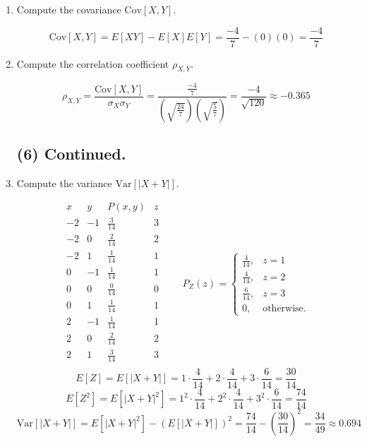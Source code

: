 \documentclass[12pt]{article}
\newenvironment{bluetext}
    {\par\begingroup\color{blue}\parindent=0pt\ignorespaces}
    {\par\endgroup\noindent\ignorespacesafterend}
\begin{document}
\begin{enumerate}
\begin{bluetext}
\[        \]
    \end{bluetext}
    \item[(c)] Compute the covariance $\mathrm{Cov}[X, Y]$.
        \begin{bluetext}
            \[
            \mathrm{Cov}[X,Y]=E[XY]-E[X]E[Y]= \frac{-4}{7}-\left(0\right)\left(0\right)=\frac{-4}{7}
            \]
        \end{bluetext}
    \item[(d)] Compute the correlation coefficient $\rho_{X,Y}$.
        \begin{bluetext}
            \[
            \rho_{X,Y}=\frac{\mathrm{Cov}[X,Y]}{\sigma_X\sigma_Y}=\frac{\frac{-4}{7}}{\left(\sqrt{\frac{24}{7}}\right)\left(\sqrt{\frac{5}{7}}\right)}=\frac{-4}{\sqrt{120}}\approx-0.365
            \]
        \end{bluetext}
    \subsection*{(6) Continued.}
    \item[(e)] Compute the variance $\mathrm{Var}[|X + Y|]$.
        \begin{bluetext}
            \[
\begin{array}{c|c|c|c}
x & y & P(x,y) & z \\ \hline
-2 & -1 & \frac{3}{14} & 3 \\[4pt]
-2 & 0 & \frac{2}{14} & 2 \\[4pt]
-2 & 1 & \frac{1}{14} & 1 \\[4pt]
0  & -1 & \frac{1}{14} & 1 \\[4pt]
0  & 0 & \frac{0}{14} & 0 \\[4pt]
0  & 1 & \frac{1}{14} & 1 \\[4pt]
2  & -1 & \frac{1}{14} & 1 \\[4pt]
2  & 0 & \frac{2}{14} & 2 \\[4pt]
2  & 1 & \frac{3}{14} & 3 \\
\end{array}\qquad P_Z(z)=\begin{cases}
        \frac{4}{14}, & z=1\\
        \frac{4}{14}, & z=2  \\
        \frac{6}{14}, & z=3  \\
        0, & \text{otherwise.}
\end{cases}\]
\[E[Z]=E[|X+Y|]=1\cdot\frac{4}{14}+2\cdot\frac{4}{14}+3\cdot\frac{6}{14}=\frac{30}{14}\]
\[E[Z^2]=E[|X+Y|^2]=1^2\cdot\frac{4}{14}+2^2\cdot\frac{4}{14}+3^2\cdot\frac{6}{14}=\frac{74}{14}\]
            \[
            \mathrm{Var}[|X + Y|]=E[|X + Y|^2]-\left(E[|X + Y|]\right)^2=\frac{74}{14}-\left(\frac{30}{14}\right)^2=\frac{34}{49}\approx0.694
            \]
        \end{bluetext}
\end{enumerate}
\newpage
\end{document}
